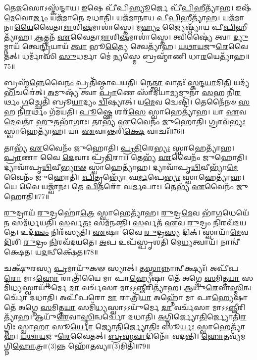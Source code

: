 𑌤𑍇\-\ul{𑌜}\-𑌸𑍋𑌽𑌸𑍍𑌕᳴𑌨𑍍𑌦𑌾𑌯। 
\-\ul{𑌇}\-𑌷𑍇 𑌪𑍀᳴𑌪𑌿\-\ul{𑌹𑍍𑌯𑍂}\-𑌰𑍍𑌜𑍇 𑌪𑍀᳴\-\ul{𑌪𑌿}\-𑌹𑍀𑌤𑍍𑌯𑌾᳴𑌹। 
𑌇𑌷᳴\-\ul{𑌮𑍇}\-𑌵𑍋\-\ul{𑌰𑍍𑌜𑌂} 𑌯𑌜᳴𑌮𑌾𑌨𑍇 𑌦𑌧𑌾𑌤𑌿। 
𑌯𑌜᳴𑌮𑌾𑌨𑌾𑌯 𑌪𑍀\-\ul{𑌪𑌿}\-𑌹𑍀𑌤𑍍𑌯𑌾᳴𑌹। 
𑌯𑌜᳴𑌮𑌾𑌨𑌾\-\ul{𑌯𑍈}\-𑌵𑍈𑌤𑌾\-\-\ul{𑌮𑌾}\-𑌶𑌿\-\ul{𑌷}\-\-𑌮𑌾\-𑌶𑌾॑𑌸𑍍𑌤𑍇। 
𑌮\-\ul{𑌹𑍍𑌯𑌂} 𑌜𑍍𑌯𑍈𑌷𑍍𑌠𑍍𑌯𑌾᳴𑌯 𑌪𑍀\-\ul{𑌪𑌿}\-𑌹𑍀𑌤𑍍𑌯𑌾᳴𑌹। 
\-\ul{𑌆}\-𑌤𑍍𑌮𑌨᳴ \ul{𑌏}\-𑌵𑍈𑌤𑌾\-\-\ul{𑌮𑌾}\-𑌶𑌿\-\ul{𑌷}\-\-𑌮𑌾\-𑌶𑌾॑𑌸𑍍𑌤𑍇। 
𑌤𑍍𑌵𑌿𑌷𑍍𑌯𑍈॑ 𑌤𑍍𑌵𑌾 \ul{𑌦𑍍𑌯𑍁}\-𑌮𑍍𑌨𑌾𑌯᳴ 𑌤𑍍𑌵𑍇\-\ul{𑌨𑍍𑌦𑍍𑌰𑌿}\-𑌯𑌾𑌯᳴ \ul{𑌤𑍍𑌵𑌾} 𑌭𑍂\-\ul{𑌤𑍍𑌯𑍈} 𑌤𑍍𑌵𑍇𑌤𑍍𑌯𑌾᳴𑌹। 
\-\ul{𑌯}\-\-\ul{𑌥𑌾}\-\-\ul{𑌯}\-𑌜𑍁\-\ul{𑌰𑍇}\-𑌵𑍈𑌤𑌤𑍍। 
𑌧𑌰𑍍𑌮𑌾᳴𑌸𑌿 \ul{𑌸𑍁}\-𑌧𑌰𑍍𑌮𑌾 𑌮𑍇॑ \ul{𑌨𑍍𑌯}\-𑌸𑍍𑌮𑍇 𑌬𑍍𑌰𑌹𑍍𑌮𑌾᳴𑌣𑌿 𑌧𑌾\-\ul{𑌰}\-𑌯𑍇𑌤𑍍𑌯𑌾᳴𑌹॥75॥

𑌬𑍍𑌰𑌹𑍍𑌮᳴\-\ul{𑌨𑍍𑌨𑍇}\-𑌵𑍈\-\ul{𑌨𑌂} 𑌪𑍍𑌰𑌤𑌿᳴𑌷𑍍𑌠𑌾𑌪𑌯𑌤𑌿। 
𑌨𑍇\-\ul{𑌤𑍍𑌤𑍍𑌵𑌾} 𑌵𑌾𑌤𑌃᳴ \ul{𑌸𑍍𑌕}\-𑌨𑍍𑌦\-\ul{𑌯𑌾}\-𑌦𑌿\-\ul{𑌤𑌿} 𑌯𑌦𑍍𑌯᳴\-\ul{𑌭𑌿}\-𑌚𑌰𑍇॑𑌤𑍍। 
\-\ul{𑌅}\-𑌮𑍁𑌷𑍍𑌯᳴ 𑌤𑍍𑌵𑌾 \ul{𑌪𑍍𑌰𑌾}\-𑌣𑍇 𑌸𑌾᳴𑌦𑌯𑌾\-\ul{𑌮𑍍𑌯}\-𑌮𑍁𑌨𑌾᳴ \ul{𑌸}\-𑌹 𑌨𑌿᳴\-\ul{𑌰}\-𑌰𑍍𑌥𑌂 \ul{𑌗}\-𑌚𑍍𑌛𑍇𑌤𑌿᳴ 𑌬𑍍𑌰𑍂\-\ul{𑌯𑌾}\-𑌦𑍍𑌯𑌂 \ul{𑌦𑍍𑌵𑌿}\-𑌷𑍍𑌯𑌾𑌤𑍍। 
𑌯\-\ul{𑌮𑍇}\-𑌵 𑌦𑍍𑌵𑍇𑌷𑍍𑌟𑌿᳴। 
𑌤𑍇𑌨𑍈᳴𑌨𑍞 \ul{𑌸}\-𑌹 𑌨𑌿᳴\-\ul{𑌰}\-𑌰𑍍𑌥𑌂 𑌗᳴𑌮𑌯𑌤𑌿। 
\-\ul{𑌪𑍂}\-𑌷𑍍𑌣𑍇 𑌶𑌰᳴\-\ul{𑌸𑍇} 𑌸𑍍𑌵𑌾𑌹𑍇𑌤𑍍𑌯𑌾᳴𑌹। 
𑌯𑌾 \ul{𑌏}\-𑌵 \ul{𑌦𑍇}\-𑌵𑌤𑌾᳴ \ul{𑌹𑍁}\-𑌤𑌭𑌾᳴𑌗𑌾𑌃। 
𑌤𑌾𑌭𑍍𑌯᳴ \ul{𑌏}\-𑌵𑍈𑌨𑌂᳴ 𑌜𑍁𑌹𑍋𑌤𑌿। 
𑌗𑍍𑌰𑌾𑌵᳴\-\ul{𑌭𑍍𑌯𑌃} 𑌸𑍍𑌵𑌾𑌹𑍇𑌤𑍍𑌯𑌾᳴𑌹। 
𑌯𑌾 \ul{𑌏}\-𑌵𑌾𑌨𑍍𑌤𑌰𑌿᳴\-\ul{𑌕𑍍𑌷𑍇} 𑌵𑌾𑌚𑌃᳴॥76॥

𑌤𑌾𑌭𑍍𑌯᳴ \ul{𑌏}\-𑌵𑍈𑌨𑌂᳴ 𑌜𑍁𑌹𑍋𑌤𑌿। 
\-\ul{𑌪𑍍𑌰}\-\-\ul{𑌤𑌿}\-𑌰𑍇\-\ul{𑌭𑍍𑌯𑌃} 𑌸𑍍𑌵𑌾𑌹𑍇𑌤𑍍𑌯𑌾᳴𑌹। 
\-\ul{𑌪𑍍𑌰𑌾}\-𑌣𑌾 𑌵𑍈 \ul{𑌦𑍇}\-𑌵𑌾𑌃 𑌪𑍍𑌰᳴\-\ul{𑌤𑌿}\-𑌰𑌾𑌃। 
𑌤𑍇𑌭𑍍𑌯᳴ \ul{𑌏}\-𑌵𑍈𑌨𑌂᳴ 𑌜𑍁𑌹𑍋𑌤𑌿। 
𑌦𑍍𑌯𑌾𑌵𑌾᳴𑌪𑍃\-\ul{𑌥𑌿}\-𑌵𑍀\-\ul{𑌭𑍍𑌯𑌾}\-\-\ul{𑍟} 𑌸𑍍𑌵𑌾𑌹𑍇𑌤𑍍𑌯𑌾᳴𑌹। 
𑌦𑍍𑌯𑌾𑌵𑌾᳴𑌪𑍃\-\ul{𑌥𑌿}\-𑌵𑍀𑌭𑍍𑌯𑌾᳴\-\ul{𑌮𑍇}\-𑌵𑍈𑌨𑌂᳴ 𑌜𑍁𑌹𑍋𑌤𑌿। 
\-\ul{𑌪𑌿}\-𑌤𑍃𑌭𑍍𑌯𑍋᳴ 𑌘\-\ul{𑌰𑍍𑌮}\-𑌪𑍇\-\ul{𑌭𑍍𑌯𑌃} 𑌸𑍍𑌵𑌾𑌹𑍇𑌤𑍍𑌯𑌾᳴𑌹। 
𑌯𑍇 𑌵𑍈 𑌯𑌜𑍍𑌵𑌾᳴𑌨𑌃। 
𑌤𑍇 \ul{𑌪𑌿}\-𑌤𑌰𑍋᳴ 𑌘\-\ul{𑌰𑍍𑌮}\-𑌪𑌾𑌃। 
𑌤𑍇𑌭𑍍𑌯᳴ \ul{𑌏}\-𑌵𑍈𑌨𑌂᳴ 𑌜𑍁𑌹𑍋𑌤𑌿॥77॥

\-\ul{𑌰𑍁}\-𑌦𑍍𑌰𑌾𑌯᳴ \ul{𑌰𑍁}\-𑌦𑍍𑌰𑌹𑍋॑\-\ul{𑌤𑍍𑌰𑍇} 𑌸𑍍𑌵𑌾𑌹𑍇𑌤𑍍𑌯𑌾᳴𑌹। 
\-\ul{𑌰𑍁}\-𑌦𑍍𑌰\-\ul{𑌮𑍇}\-𑌵 𑌭𑌾᳴\-\ul{𑌗}\-𑌧𑍇𑌯𑍇᳴\-\ul{𑌨} 𑌸𑌮᳴𑌰𑍍𑌧𑌯𑌤𑌿। 
\-\ul{𑌸}\-𑌰𑍍𑌵\-\ul{𑌤𑌃} 𑌸𑌮᳴𑌨𑌕𑍍𑌤𑌿। 
\-\ul{𑌸}\-𑌰𑍍𑌵𑌤᳴ \ul{𑌏}\-𑌵 \ul{𑌰𑍁}\-𑌦𑍍𑌰𑌂 \ul{𑌨𑌿}\-𑌰𑌵᳴𑌦𑌯𑌤𑍇। 
𑌉𑌦᳴\-\ul{𑌞𑍍𑌚𑌂} 𑌨𑌿𑌰᳴𑌸𑍍𑌯𑌤𑌿। 
\-\ul{𑌏}\-𑌷𑌾 𑌵𑍈 \ul{𑌰𑍁}\-𑌦𑍍𑌰\-\ul{𑌸𑍍𑌯} 𑌦𑌿𑌕𑍍। 
𑌸𑍍𑌵𑌾𑌯𑌾᳴\-\ul{𑌮𑍇}\-𑌵 \ul{𑌦𑌿}\-𑌶𑌿 \ul{𑌰𑍁}\-𑌦𑍍𑌰𑌂 \ul{𑌨𑌿}\-𑌰𑌵᳴𑌦𑌯𑌤𑍇। 
\-\ul{𑌅}\-𑌪 𑌉𑌪᳴𑌸𑍍𑌪𑍃𑌶𑌤𑌿 𑌮𑍇\-\ul{𑌧𑍍𑌯}\-𑌤𑍍𑌵𑌾𑌯᳴। 
𑌨𑌾𑌨𑍍𑌵𑍀॑𑌕𑍍𑌷𑍇𑌤। 
𑌯\-\ul{𑌦}\-𑌨𑍍𑌵𑍀𑌕𑍍𑌷𑍇᳴𑌤॥78॥

𑌚𑌕𑍍𑌷𑍁᳴𑌰𑌸𑍍𑌯 \ul{𑌪𑍍𑌰}\-𑌮𑌾𑌯𑍁᳴𑌕𑍟 𑌸𑍍𑌯𑌾𑌤𑍍। 
𑌤\-\ul{𑌸𑍍𑌮𑌾}\-𑌨𑍍𑌨𑌾𑌨𑍍𑌵𑍀𑌕𑍍𑌷𑍍𑌯𑌃᳴। 
𑌅𑌪𑍀᳴𑌪\-\ul{𑌰𑍋} 𑌮𑌾𑌽\-\ul{𑌹𑍍𑌨𑍋} 𑌰𑌾𑌤𑍍𑌰𑌿᳴𑌯𑍈 𑌮𑌾 𑌪𑌾\-\ul{𑌹𑍍𑌯𑍇}\-𑌷𑌾 𑌤𑍇᳴ 𑌅𑌗𑍍𑌨𑍇 \ul{𑌸}\-𑌮𑌿𑌤𑍍𑌤\-\ul{𑌯𑌾} 𑌸𑌮𑌿᳴\-\ul{𑌧𑍍𑌯}\-𑌸𑍍𑌵𑌾𑌯𑍁᳴𑌰𑍍𑌮𑍇 \ul{𑌦𑌾} 𑌵𑌰𑍍𑌚᳴𑌸𑌾 𑌮𑌾𑌽𑌽\-\ul{𑌞𑍍𑌜𑍀}\-𑌰𑌿𑌤𑍍𑌯𑌾᳴𑌹। 
𑌆𑌯𑍁᳴\-\ul{𑌰𑍇}\-𑌵𑌾\-\ul{𑌸𑍍𑌮𑌿}\-𑌨𑍍𑌵𑌰𑍍𑌚𑍋᳴ 𑌦𑌧𑌾𑌤𑌿। 
𑌅𑌪𑍀᳴𑌪𑌰𑍋 \ul{𑌮𑌾} 𑌰𑌾𑌤𑍍𑌰𑌿᳴\-\ul{𑌯𑌾} 𑌅𑌹𑍍𑌨𑍋᳴ 𑌮𑌾 𑌪𑌾\-\ul{𑌹𑍍𑌯𑍇}\-𑌷𑌾 𑌤𑍇᳴ 𑌅𑌗𑍍𑌨𑍇 \ul{𑌸}\-𑌮𑌿𑌤𑍍𑌤\-\ul{𑌯𑌾} 𑌸𑌮𑌿᳴\-\ul{𑌧𑍍𑌯}\-𑌸𑍍𑌵𑌾𑌽𑌽𑌯𑍁᳴𑌰𑍍𑌮𑍇 \ul{𑌦𑌾} 𑌵𑌰𑍍𑌚᳴𑌸𑌾 𑌮𑌾𑌽𑌽\-\ul{𑌞𑍍𑌜𑍀}\-𑌰𑌿𑌤𑍍𑌯𑌾᳴𑌹। 
𑌆𑌯𑍁᳴\-\ul{𑌰𑍇}\-𑌵𑌾\-\ul{𑌸𑍍𑌮𑌿}\-𑌨𑍍𑌵𑌰𑍍𑌚𑍋᳴ 𑌦𑌧𑌾𑌤𑌿। 
\-\ul{𑌅}\-𑌗𑍍𑌨𑌿𑌰𑍍𑌜𑍍𑌯𑍋\-\ul{𑌤𑌿}\-𑌰𑍍𑌜𑍍𑌯𑍋𑌤𑌿᳴\-\ul{𑌰}\-𑌗𑍍𑌨𑌿𑌃 𑌸𑍍𑌵𑌾\-\ul{𑌹𑌾} 𑌸𑍂\-\ul{𑌰𑍍𑌯𑍋} 𑌜𑍍𑌯𑍋\-\ul{𑌤𑌿}\-𑌰𑍍𑌜𑍍𑌯𑍋\-\ul{𑌤𑌿𑌃} 𑌸𑍂\-\ul{𑌰𑍍𑌯𑌃} 𑌸𑍍𑌵𑌾𑌹𑍇𑌤𑍍𑌯𑌾᳴𑌹। 
\-\ul{𑌯}\-\-\ul{𑌥𑌾}\-\-\ul{𑌯}\-𑌜𑍁\-\ul{𑌰𑍇}\-𑌵𑍈𑌤𑌤𑍍। 
\-\ul{𑌬𑍍𑌰}\-\-\ul{𑌹𑍍𑌮}\-\-\ul{𑌵𑌾}\-𑌦𑌿𑌨𑍋᳴ 𑌵𑌦𑌨𑍍𑌤𑌿। 
\-\ul{𑌹𑍋}\-\-\ul{𑌤}\-𑌵𑍍𑌯᳴𑌮𑌗𑍍𑌨𑌿\-\ul{𑌹𑍋}\-𑌤𑍍𑌰𑌾(3)𑌨𑍍𑌨 𑌹𑍋᳴\-\ul{𑌤}\-𑌵𑍍𑌯𑌾(3)𑌮𑌿𑌤𑌿᳴॥79॥

